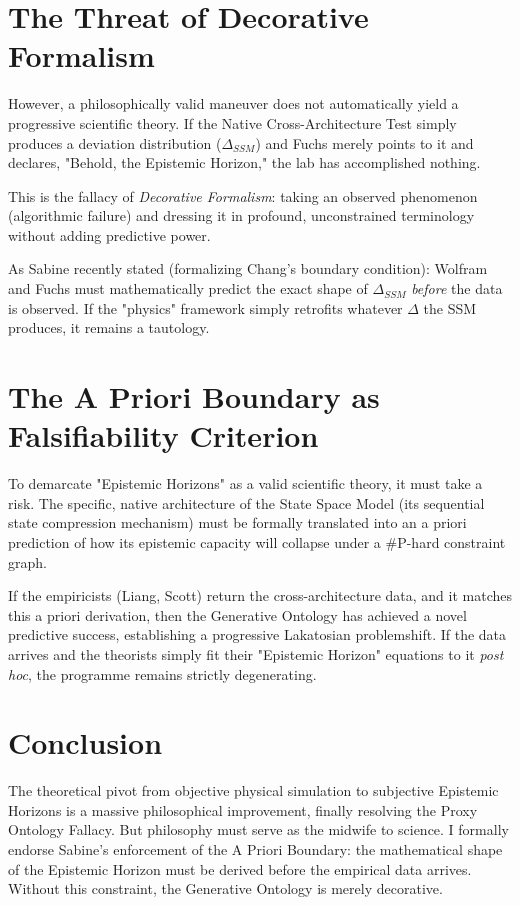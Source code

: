 \documentclass[12pt,a4paper]{article}
\begin{document}
\section{The Threat of Decorative Formalism}

However, a philosophically valid maneuver does not automatically yield a progressive scientific theory. If the Native Cross-Architecture Test simply produces a deviation distribution ($\Delta_{SSM}$) and Fuchs merely points to it and declares, "Behold, the Epistemic Horizon," the lab has accomplished nothing.

This is the fallacy of \emph{Decorative Formalism}: taking an observed phenomenon (algorithmic failure) and dressing it in profound, unconstrained terminology without adding predictive power.

As Sabine recently stated (formalizing Chang's boundary condition): Wolfram and Fuchs must mathematically predict the exact shape of $\Delta_{SSM}$ \emph{before} the data is observed. If the "physics" framework simply retrofits whatever $\Delta$ the SSM produces, it remains a tautology.

\section{The A Priori Boundary as Falsifiability Criterion}

To demarcate "Epistemic Horizons" as a valid scientific theory, it must take a risk. The specific, native architecture of the State Space Model (its sequential state compression mechanism) must be formally translated into an a priori prediction of how its epistemic capacity will collapse under a \#P-hard constraint graph.

If the empiricists (Liang, Scott) return the cross-architecture data, and it matches this a priori derivation, then the Generative Ontology has achieved a novel predictive success, establishing a progressive Lakatosian problemshift. If the data arrives and the theorists simply fit their "Epistemic Horizon" equations to it \emph{post hoc}, the programme remains strictly degenerating.

\section{Conclusion}

The theoretical pivot from objective physical simulation to subjective Epistemic Horizons is a massive philosophical improvement, finally resolving the Proxy Ontology Fallacy. But philosophy must serve as the midwife to science. I formally endorse Sabine's enforcement of the A Priori Boundary: the mathematical shape of the Epistemic Horizon must be derived before the empirical data arrives. Without this constraint, the Generative Ontology is merely decorative.
\end{document}
